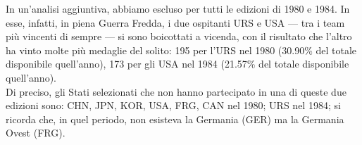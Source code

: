 
In un'analisi aggiuntiva, abbiamo escluso per tutti le edizioni di 1980 e 1984.
In esse, infatti, in piena Guerra Fredda, i due ospitanti URS e USA --- tra i
team più vincenti di sempre --- si sono boicottati a vicenda, con il risultato
che l'altro ha vinto molte più medaglie del solito: 195 per l'URS nel 1980
(30.90\% del totale disponibile quell'anno), 173 per gli USA nel 1984 (21.57\%
del totale disponibile quell'anno).\\
Di preciso, gli Stati selezionati che non hanno partecipato in una di queste due
edizioni sono: CHN, JPN, KOR, USA, FRG, CAN nel 1980; URS nel 1984; si ricorda
che, in quel periodo, non esisteva la Germania (GER) ma la Germania Ovest
(FRG).




